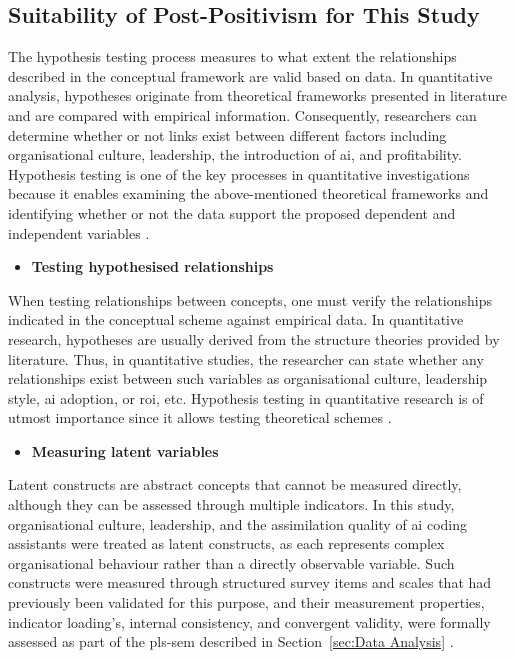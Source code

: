 \subsection{Suitability of Post-Positivism for This Study}
\label{sec:Suitability of Post-Positivism for This Study}
The hypothesis testing process measures to what extent the relationships described in the conceptual framework are valid based on data. In quantitative analysis, hypotheses originate from theoretical frameworks presented in literature and are compared with empirical information. Consequently, researchers can determine whether or not links exist between different factors including organisational culture, leadership, the introduction of \gls{ai}, and profitability. Hypothesis testing is one of the key processes in quantitative investigations because it enables examining the above-mentioned theoretical frameworks and identifying whether or not the data support the proposed dependent and independent variables \autocite{Creswell2018}.

\begin{itemize}
	\item \textbf{Testing hypothesised relationships}
\end{itemize}
When testing relationships between concepts, one must verify the relationships indicated in the conceptual scheme against empirical data. In quantitative research, hypotheses are usually derived from the structure theories provided by literature. Thus, in quantitative studies, the researcher can state whether any relationships exist between such variables as organisational culture, leadership style, \gls{ai} adoption, or \gls{roi}, etc. Hypothesis testing in quantitative research is of utmost importance since it allows testing theoretical schemes \autocite{Creswell2018}.

\begin{itemize}
	\item \textbf{Measuring latent variables}
\end{itemize}
Latent constructs are abstract concepts that cannot be measured directly, although they can be assessed through multiple indicators. In this study, organisational culture, leadership, and the assimilation quality of \gls{ai} coding assistants were treated as latent constructs, as each represents complex organisational behaviour rather than a directly observable variable. Such constructs were measured through structured survey items and scales that had previously been validated for this purpose, and their measurement properties, indicator loading's, internal consistency, and convergent validity, were formally assessed as part of the \gls{pls-sem} described in Section~\ref{sec:Data Analysis} \autocite{Hair2019}.

